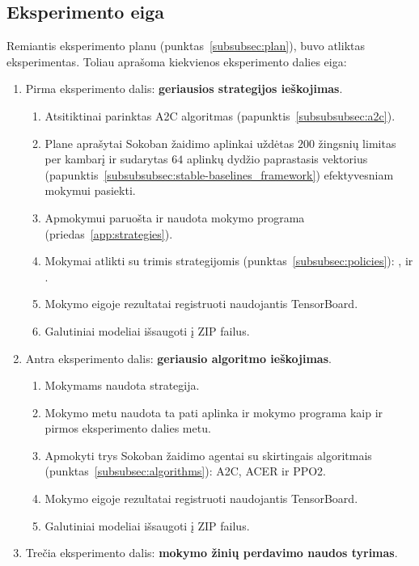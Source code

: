 \documentclass{VUMIFPSbakalaurinis}
\begin{document}
\subsection{Eksperimento eiga}\label{subsubsec:experiment}
{
	Remiantis eksperimento planu (punktas~\ref{subsubsec:plan}), buvo atliktas eksperimentas. Toliau aprašoma kiekvienos eksperimento dalies eiga:
	\begin{enumerate}
		\item Pirma eksperimento dalis: \textbf{geriausios strategijos ieškojimas}.
		\begin{enumerate}
			\item Atsitiktinai parinktas A2C algoritmas (papunktis~\ref{subsubsubsec:a2c}).
			\item Plane aprašytai Sokoban žaidimo aplinkai uždėtas \(200\) žingsnių limitas per kambarį ir sudarytas \(64\) aplinkų dydžio paprastasis vektorius (papunktis~\ref{subsubsubsec:stable-baselines_framework}) efektyvesniam mokymui pasiekti.
			\item Apmokymui paruošta ir naudota mokymo programa (priedas~\ref{app:strategies}).
			\item Mokymai atlikti su trimis strategijomis (punktas~\ref{subsubsec:policies}): ,  ir .
			\item Mokymo eigoje rezultatai registruoti naudojantis TensorBoard.
			\item Galutiniai modeliai išsaugoti į ZIP failus.
		\end{enumerate}
		\item Antra eksperimento dalis: \textbf{geriausio algoritmo ieškojimas}.
		\begin{enumerate}
			\item Mokymams naudota  strategija.
			\item Mokymo metu naudota ta pati aplinka ir mokymo programa kaip ir pirmos eksperimento dalies metu.
			\item Apmokyti trys Sokoban žaidimo agentai su skirtingais algoritmais (punktas~\ref{subsubsec:algorithms}): A2C, ACER ir PPO2.
			\item Mokymo eigoje rezultatai registruoti naudojantis TensorBoard.
			\item Galutiniai modeliai išsaugoti į ZIP failus.
		\end{enumerate}
		\item Trečia eksperimento dalis: \textbf{mokymo žinių perdavimo naudos tyrimas}.
		\begin{enumerate}

\end{enumerate}
\end{enumerate}}
\end{document}
